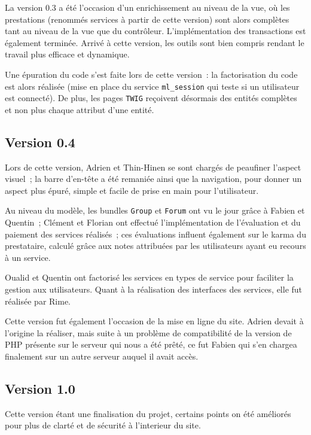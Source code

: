 La version 0.3 a été l'occasion d'un enrichissement au niveau de la vue, où les prestations (renommés services à partir de cette version) sont alors complètes tant au niveau de la vue que du contrôleur. L'implémentation des transactions est également terminée.
Arrivé à cette version, les outils sont bien compris rendant le travail plus efficace et dynamique.

Une épuration du code s'est faite lors de cette version~: la factorisation du code est alors réalisée (mise en place du service \verb|ml_session| qui teste si un utilisateur est connecté). De plus, les pages \verb|TWIG| reçoivent désormais des entités complètes et non plus chaque attribut d'une entité.

\subsection{Version 0.4}

Lors de cette version, Adrien et Thin-Hinen se sont chargés de peaufiner l’aspect visuel~; la barre d'en-tête a été remaniée ainsi que la navigation, pour donner un aspect plus épuré, simple et facile de prise en main pour l’utilisateur.

Au niveau du modèle, les bundles \verb|Group| et \verb|Forum| ont vu le jour grâce à Fabien et Quentin~; Clément et Florian ont effectué l'implémentation de l'évaluation et du paiement des services réalisés~; ces évaluations influent également sur le karma du prestataire, calculé grâce aux notes attribuées par les utilisateurs ayant eu recours à un service.

Oualid et Quentin ont factorisé les services en types de service pour faciliter la gestion aux utilisateurs. Quant à la réalisation des interfaces des services, elle fut réalisée par Rime.

Cette version fut également l'occasion de la mise en ligne du site. Adrien devait à l'origine la réaliser, mais suite à un problème de compatibilité de la version de PHP présente sur le serveur qui nous a été prêté, ce fut Fabien qui s'en chargea finalement sur un autre serveur auquel il avait accès.

\subsection{Version 1.0}

Cette version étant une finalisation du projet, certains points on été améliorés pour plus de clarté et de sécurité à l'interieur du site.

